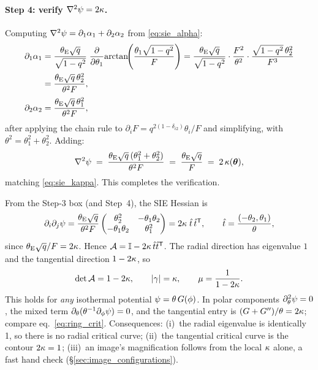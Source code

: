 \paragraph{Step 4: verify $\nabla^2\psi = 2\kappa$.}
Computing
$\nabla^2\psi = \partial_1\alpha_1 + \partial_2\alpha_2$ from
\eqref{eq:sie_alpha}:
\begin{align*}
    \partial_1\alpha_1
    &= \frac{\theta_{\mathrm{E}}\sqrt{q}}{\sqrt{1-q^2}}\;
       \frac{\partial}{\partial\theta_1}\!
            \arctan\!\!\left(\frac{\theta_1\sqrt{1-q^2}}{F}\right)
     = \frac{\theta_{\mathrm{E}}\sqrt{q}}{\sqrt{1-q^2}}
       \cdot \frac{F^2}{\theta^2}\cdot\frac{\sqrt{1-q^2}\,\theta_2^2}{F^{3}} \\
    &= \frac{\theta_{\mathrm{E}}\sqrt{q}\,\theta_2^2}{\theta^2 F},
    \\[2pt]
    \partial_2\alpha_2
    &= \frac{\theta_{\mathrm{E}}\sqrt{q}\,\theta_1^2}{\theta^2 F},
\end{align*}
after applying the chain rule to $\partial_i F = q^{2(1-\delta_{i2})}\theta_i/F$
and simplifying, with $\theta^2 = \theta_1^2+\theta_2^2$.  Adding:
\begin{equation}
    \nabla^2\psi \;=\;
        \frac{\theta_{\mathrm{E}}\sqrt{q}\,(\theta_1^2 + \theta_2^2)}{\theta^2 F}
    \;=\; \frac{\theta_{\mathrm{E}}\sqrt{q}}{F}
    \;=\; 2\,\kappa(\boldsymbol{\theta}),
    \label{eq:sie_poisson_check}
\end{equation}
matching \eqref{eq:sie_kappa}.  This completes the verification.

\begin{derivation}[Every isothermal lens has $\det\Amat = 1 - 2\kappab$]
From the Step-3 box (and Step~4), the SIE Hessian is
\[
  \partial_i\partial_j\psi = \frac{\theta_{\mathrm{E}}\sqrt{q}}{\theta^2F}
  \begin{pmatrix}\theta_2^2 & -\theta_1\theta_2\\ -\theta_1\theta_2 & \theta_1^2\end{pmatrix}
  = 2\kappa\;\hat{t}\,\hat{t}^{\mathsf T},
  \qquad \hat{t} = \frac{(-\theta_2,\theta_1)}{\theta},
\]
since $\theta_{\mathrm{E}}\sqrt{q}/F = 2\kappa$.  Hence
$\mathcal{A} = \mathbb{I} - 2\kappa\,\hat{t}\hat{t}^{\mathsf T}$.  The radial
direction has eigenvalue $1$ and the tangential direction $1-2\kappa$, so
\[
  \det\mathcal{A} = 1 - 2\kappa, \qquad |\gamma| = \kappa, \qquad
  \mu = \frac{1}{1-2\kappa}.
\]
This holds for \emph{any} isothermal potential $\psi = \theta\,G(\phi)$.  In
polar components $\partial_\theta^2\psi = 0$, the mixed term
$\partial_\theta(\theta^{-1}\partial_\phi\psi) = 0$, and the tangential entry
is $(G+G'')/\theta = 2\kappa$; compare eq.~\eqref{eq:ring_crit}.
Consequences: (i)~the radial eigenvalue is identically 1, so there is no
radial critical curve; (ii)~the tangential critical curve is the contour
$2\kappa = 1$; (iii)~an image's magnification follows from the local
$\kappa$ alone, a fast hand check (\S\ref{sec:image_configurations}).
\end{derivation}


